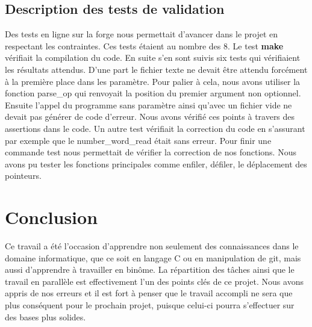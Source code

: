 \documentclass[12pt]{article}
\begin{document}
\subsection{Description des tests de validation}
Des tests en ligne sur la forge nous permettait d'avancer dans le projet en respectant les contraintes. Ces tests étaient au nombre des 8. Le test \textbf{make} vérifiait la compilation du code. En suite s'en sont suivis six tests qui vérifiaient les résultats attendus. D'une part le fichier texte ne devait être attendu forcément à la première place dans les paramètre. Pour palier à cela, nous avons utiliser la fonction parse\_op qui renvoyait la position du premier argument non optionnel. Ensuite l'appel du programme sans paramètre ainsi qu'avec un fichier vide ne devait pas générer de code d'erreur. Nous avons vérifié ces points à travers des assertions dans le code. Un autre test vérifiait la correction du code en s'assurant par exemple que le number\_word\_read était sans erreur. Pour finir une commande test nous permettait de vérifier la correction de nos fonctions. Nous avons pu tester les fonctions principales comme enfiler, défiler, le déplacement des pointeurs. 
\newpage
\section*{Conclusion}
Ce travail a été l'occasion d'apprendre non seulement des connaissances dans le domaine informatique, que ce soit en langage C ou en manipulation de git, mais aussi d'apprendre à travailler en binôme. La répartition des tâches ainsi que le travail en parallèle est effectivement l'un des points clés de ce projet. Nous avons appris de nos erreurs et il est fort à penser que le travail accompli ne sera que plus conséquent pour le prochain projet, puisque celui-ci pourra s'effectuer sur des bases plus solides.
\end{document}
